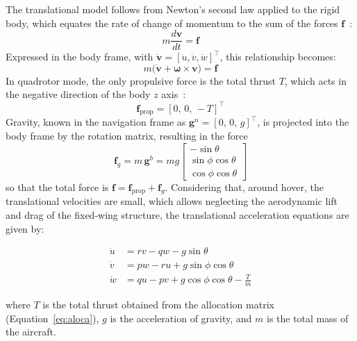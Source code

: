 \documentclass{ieeeaccess}
\begin{document}
The translational model follows from Newton's second law applied to the rigid body, which equates the rate of change of momentum to the sum of the forces $\mathbf{f}$~\cite{cBeard,c11}:
\begin{equation}
m\frac{d\mathbf{v}}{dt} = \mathbf{f}
\label{eq:trans-newton}
\end{equation}
Expressed in the body frame, with $\dot{\mathbf{v}} = [\dot{u}, \dot{v}, \dot{w}]^{\top}$, this relationship becomes:
\begin{equation}
m\big(\dot{\mathbf{v}} + \boldsymbol{\omega} \times \mathbf{v}\big) = \mathbf{f}
\label{eq:trans-compact}
\end{equation}
In quadrotor mode, the only propulsive force is the total thrust $T$, which acts in the negative direction of the body $z$ axis~\cite{c4}:
\begin{equation}
\mathbf{f}_{\text{prop}} = [0,\, 0,\, -T]^{\top}
\label{eq:trans-thrust}
\end{equation}
Gravity, known in the navigation frame as $\mathbf{g}^{n}=[0,\,0,\,g]^{\top}$, is projected into the body frame by the rotation matrix, resulting in the force
\begin{equation}
\mathbf{f}_{g} = m\,\mathbf{g}^{b} = mg\begin{bmatrix} -\sin\theta \\ \sin\phi\cos\theta \\ \cos\phi\cos\theta \end{bmatrix}
\label{eq:trans-grav}
\end{equation}
so that the total force is $\mathbf{f} = \mathbf{f}_{\text{prop}} + \mathbf{f}_{g}$. Considering that, around hover, the translational velocities are small, which allows neglecting the aerodynamic lift and drag of the fixed-wing structure, the translational acceleration equations are given by:

\begin{align}
\dot{u} &= rv - qw - g\sin\theta \\
\dot{v} &= pw - ru + g\sin\phi\cos\theta \\
\dot{w} &= qu - pv + g\cos\phi\cos\theta - \frac{T}{m}
\end{align}

where $T$ is the total thrust obtained from the allocation matrix (Equation~\eqref{eq:aloca}), $g$ is the acceleration of gravity, and $m$ is the total mass of the aircraft.
\end{document}
